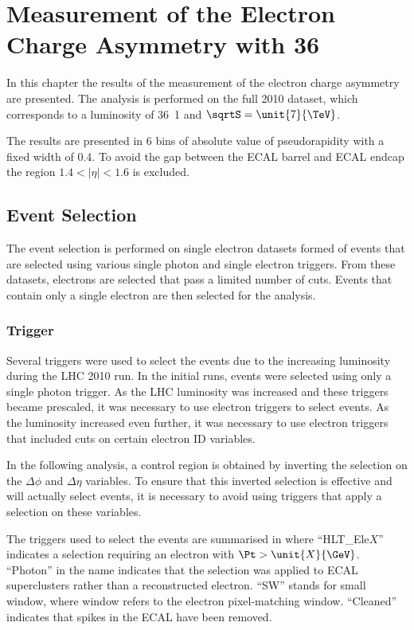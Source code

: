 \chapter[Electron Charge Asymmetry]{Measurement of the Electron Charge Asymmetry
 with \unit{36}{\invpb} }
\label{chap:analysis}

In this chapter the results of the measurement of the electron charge
asymmetry are presented. The analysis is performed on the full 2010 dataset, which corresponds to a
luminosity of \unit{36.1}{\invpb} and $\sqrtS = \unit{7}{\TeV}$.

The results are presented in 6 bins of absolute value of pseudorapidity with a
fixed width of 0.4. To avoid the gap between the ECAL barrel and ECAL endcap the
region $1.4<|\eta|<1.6$ is excluded.

\section{Event Selection}

The event selection is performed on single electron datasets formed of events
that are selected using various single photon and single electron triggers. From
these datasets, electrons are selected that pass a limited number of cuts.
Events that contain only a single electron are then selected for the analysis.

\subsection{Trigger}

Several triggers were used to select the events due to the increasing luminosity
during the \ac{LHC} 2010 run.  In the initial runs, events were selected using
only a single photon trigger.  As the \ac{LHC} luminosity was increased and
these triggers became prescaled, it was necessary to use electron triggers to
select events.  As the luminosity increased even further, it was necessary to use
electron triggers that included cuts on certain electron ID variables.

In the following analysis, a control region is obtained by inverting the
selection on the $\Delta\phi$ and $\Delta\eta$ variables. To ensure that this inverted selection is effective and will actually
select events, it is necessary to avoid using triggers that apply a selection on
these variables.

The triggers used to select the events are summarised in 
where ``HLT\_Ele$X$'' indicates a selection requiring an electron with  $\Pt > \unit{X}{\GeV}$. 
``Photon'' in the name indicates that the selection was applied to ECAL
superclusters rather than a reconstructed electron. 
``SW'' stands for small window, where window refers to the electron
pixel-matching window. 
 ``Cleaned'' indicates that spikes in the \ac{ECAL} have been removed.  


